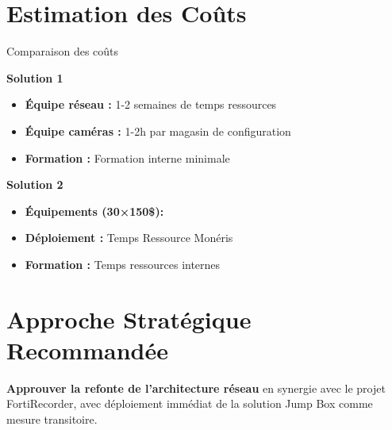 \documentclass{dollarama}
\begin{document}



\section{Estimation des Coûts}

\begin{dollaramacomparison}{Comparaison des coûts}

\textbf{Solution 1}
\begin{itemize}
\item \textbf{Équipe réseau :} 1-2 semaines de temps ressources
\item \textbf{Équipe caméras :} 1-2h par magasin de configuration
\item \textbf{Formation :} Formation interne minimale
\end{itemize}

\vscompare

\textbf{Solution 2}
\begin{itemize}
\item \textbf{Équipements \footnotesize{(30×150\$)}:} 
\item \textbf{Déploiement :} Temps Ressource Monéris
\item \textbf{Formation :} Temps ressources internes
\end{itemize}

\end{dollaramacomparison}



\section{Approche Stratégique Recommandée}

\textbf{Approuver la refonte de l'architecture réseau} en synergie avec le projet FortiRecorder, avec déploiement immédiat de la solution Jump Box comme mesure transitoire.
\end{document}
